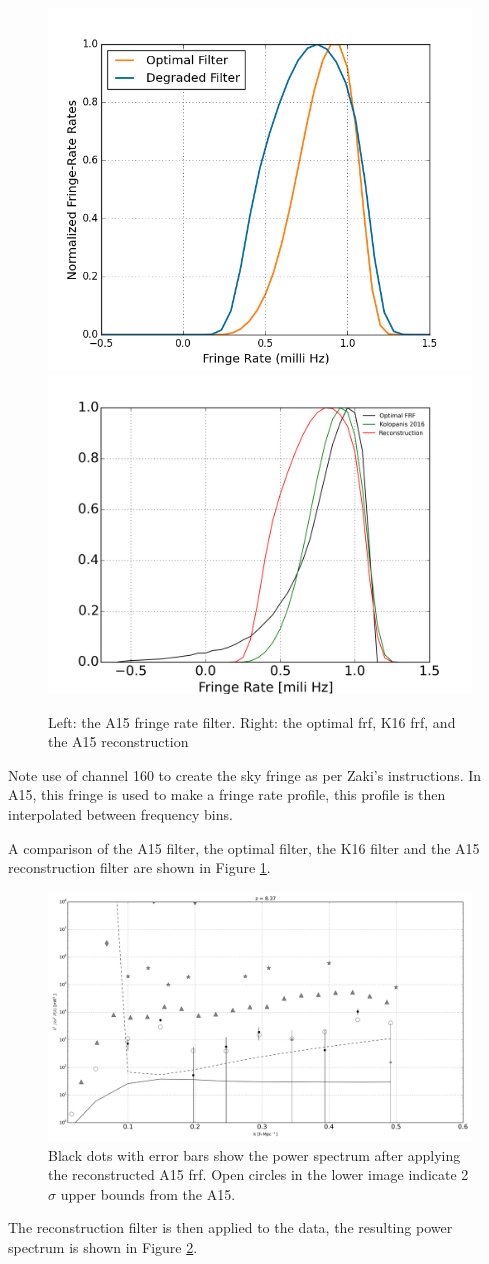 \documentclass[onecolumn]{emulateapj}
\begin{document}
{\begin{figure}[t]
\centering
\includegraphics[width=.4\textwidth]{data/alietal_frf.png}
\includegraphics[width=.45\textwidth]{data/frf_comparison.png}
\caption{\label{fig:frf} Left: the A15 fringe rate filter. Right: the optimal frf, K16 frf, and the A15 reconstruction \vspace{.35cm}}
\end{figure} 

Note use of channel 160 to create the sky fringe as per Zaki's instructions. In A15, this fringe is used to make a fringe rate profile, this profile is then interpolated between frequency bins. 


A comparison of the A15 filter, the optimal filter, the K16 filter and the A15 reconstruction filter are shown in Figure \ref{fig:frf}. %




\begin{figure}[tb]
\centering
\includegraphics[width=.8\textwidth]{data/pspec_Mar17_vanilla_ali_frf_recon_95_115_I_comparison.png}
\caption{\label{fig:recon_apj}Black dots with error bars show the power spectrum after applying the reconstructed A15 frf. Open circles in the lower image indicate 2$\sigma$ upper bounds from the A15.}
\end{figure}
The reconstruction filter is then applied to the data, the resulting power spectrum is shown in Figure \ref{fig:recon_apj}.

}
\end{document}
